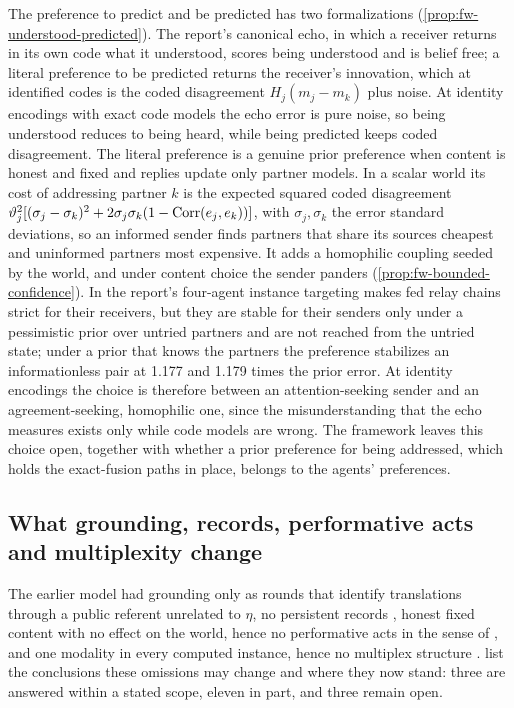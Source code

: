 The preference to predict and be predicted has two formalizations (\cref{prop:fw-understood-predicted}). The report's canonical echo, in which a receiver returns in its own code what it understood, scores being understood and is belief free; a literal preference to be predicted returns the receiver's innovation, which at identified codes is the coded disagreement $H_j(m_j-m_k)$ plus noise. At identity encodings with exact code models the echo error is pure noise, so being understood reduces to being heard, while being predicted keeps coded disagreement. The literal preference is a genuine prior preference when content is honest and fixed and replies update only partner models. In a scalar world its cost of addressing partner $k$ is the expected squared coded disagreement $\vartheta_j^2[(\sigma_j-\sigma_k)^2+2\sigma_j\sigma_k(1-\operatorname{Corr}(e_j,e_k))]$, with $\sigma_j,\sigma_k$ the error standard deviations, so an informed sender finds partners that share its sources cheapest and uninformed partners most expensive. It adds a homophilic coupling seeded by the world, and under content choice the sender panders (\cref{prop:fw-bounded-confidence}). In the report's four-agent instance targeting makes fed relay chains strict for their receivers, but they are stable for their senders only under a pessimistic prior over untried partners and are not reached from the untried state; under a prior that knows the partners the preference stabilizes an informationless pair at 1.177 and 1.179 times the prior error. At identity encodings the choice is therefore between an attention-seeking sender and an agreement-seeking, homophilic one, since the misunderstanding that the echo measures exists only while code models are wrong. The framework leaves this choice open, together with whether a prior preference for being addressed, which holds the exact-fusion paths in place, belongs to the agents' preferences.

\subsection{What grounding, records, performative acts and multiplexity change}\label{sec:min-reexamination}

The earlier model had grounding only as rounds that identify translations through a public referent unrelated to $\eta$, no persistent records \citep{heylighen2016stigmergy}, honest fixed content with no effect on the world, hence no performative acts in the sense of \citet{austin1962how}, and one modality in every computed instance, hence no multiplex structure \citep{kivela2014multilayer}.  list the conclusions these omissions may change and where they now stand: three are answered within a stated scope, eleven in part, and three remain open.

